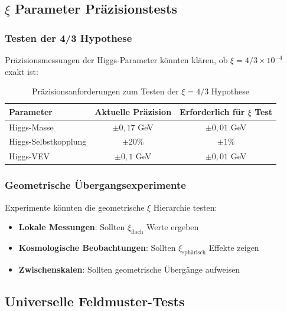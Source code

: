 	\subsection{$\xi$ Parameter Präzisionstests}
	\label{subsec:xi_praezisionstests}
	
	\subsubsection{Testen der 4/3 Hypothese}
	\label{subsubsec:testen_vier_drittel}
	
	Präzisionsmessungen der Higgs-Parameter könnten klären, ob $\xi = 4/3 \times 10^{-4}$ exakt ist:
	
	\begin{table}[htbp]
		\centering
		\begin{tabular}{lcc}
			\toprule
			\textbf{Parameter} & \textbf{Aktuelle Präzision} & \textbf{Erforderlich für $\xi$ Test} \\
			\midrule
			Higgs-Masse & $\pm 0{,}17$ GeV & $\pm 0{,}01$ GeV \\
			Higgs-Selbstkopplung & $\pm 20\%$ & $\pm 1\%$ \\
			Higgs-VEV & $\pm 0{,}1$ GeV & $\pm 0{,}01$ GeV \\
			\bottomrule
		\end{tabular}
		\caption{Präzisionsanforderungen zum Testen der $\xi = 4/3$ Hypothese}
		\label{tab:praezisionsanforderungen}
	\end{table}
	
	\subsubsection{Geometrische Übergangsexperimente}
	\label{subsubsec:geometrische_uebergaenge}
	
	Experimente könnten die geometrische $\xi$ Hierarchie testen:
	\begin{itemize}
		\item \textbf{Lokale Messungen}: Sollten $\xi_{\text{flach}}$ Werte ergeben
		\item \textbf{Kosmologische Beobachtungen}: Sollten $\xi_{\text{sphärisch}}$ Effekte zeigen
		\item \textbf{Zwischenskalen}: Sollten geometrische Übergänge aufweisen
	\end{itemize}
	
	\subsection{Universelle Feldmuster-Tests}
	\label{subsec:feldmuster_tests}
	
